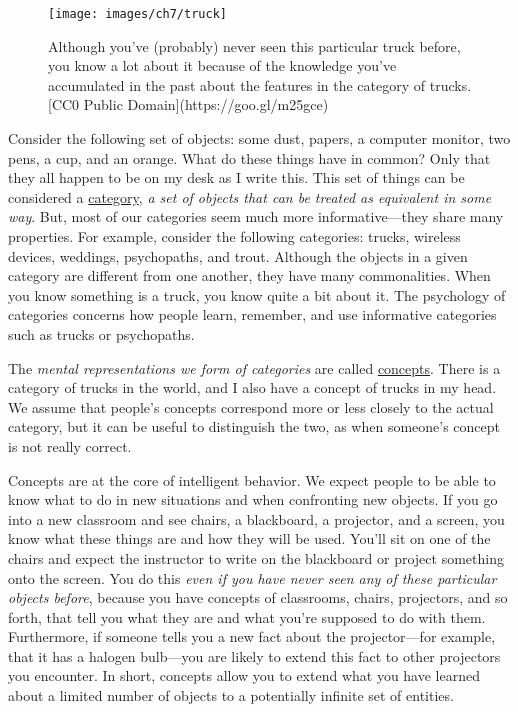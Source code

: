 \documentclass[
]{krantz}
\begin{document}
\begin{figure}

{\centering \texttt{[image: images/ch7/truck]} 

}

\caption{Although you’ve (probably) never seen this particular truck before, you know a lot about it because of the knowledge you’ve accumulated in the past about the features in the category of trucks. [CC0 Public Domain](https://goo.gl/m25gce)}\label{fig:truck}
\end{figure}

Consider the following set of objects: some dust, papers, a computer monitor, two pens, a cup, and an orange. What do these things have in common? Only that they all happen to be on my desk as I write this. This set of things can be considered a \hyperref[category]{category}, \emph{a set of objects that can be treated as equivalent in some way}. But, most of our categories seem much more informative---they share many properties. For example, consider the following categories: trucks, wireless devices, weddings, psychopaths, and trout. Although the objects in a given category are different from one another, they have many commonalities. When you know something is a truck, you know quite a bit about it. The psychology of categories concerns how people learn, remember, and use informative categories such as trucks or psychopaths.

The \emph{mental representations we form of categories} are called \href{concept}{concepts}. There is a category of trucks in the world, and I also have a concept of trucks in my head. We assume that people's concepts correspond more or less closely to the actual category, but it can be useful to distinguish the two, as when someone's concept is not really correct.

Concepts are at the core of intelligent behavior. We expect people to be able to know what to do in new situations and when confronting new objects. If you go into a new classroom and see chairs, a blackboard, a projector, and a screen, you know what these things are and how they will be used. You'll sit on one of the chairs and expect the instructor to write on the blackboard or project something onto the screen. You do this \emph{even if you have never seen any of these particular objects before}, because you have concepts of classrooms, chairs, projectors, and so forth, that tell you what they are and what you're supposed to do with them. Furthermore, if someone tells you a new fact about the projector---for example, that it has a halogen bulb---you are likely to extend this fact to other projectors you encounter. In short, concepts allow you to extend what you have learned about a limited number of objects to a potentially infinite set of entities.
\end{document}
